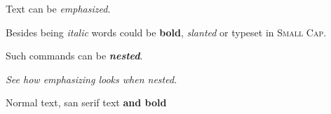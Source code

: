 \documentclass{article}
\begin{document}
{\sffamily
Text can be {\em emphasized}.

Besides being {\itshape italic} words could be {\bfseries bold}, {\slshape slanted} or typeset in {\scshape Small Cap}.

Such commands can be {\itshape\bfseries nested}.}

{\em See how {\em emphasizing} looks when nested.}

Normal text, {\sffamily san serif text {\bfseries and bold}}
\end{document}
